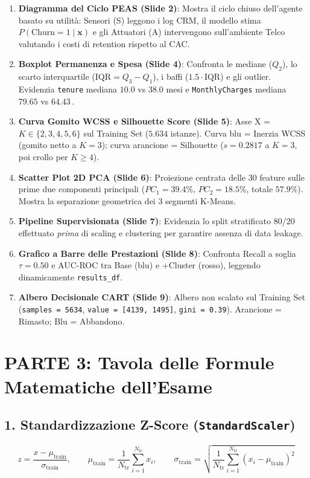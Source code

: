 \documentclass[11pt, a4paper]{article}
\begin{document}
\begin{enumerate}
    \item \textbf{Diagramma del Ciclo PEAS (Slide 2)}: Mostra il ciclo chiuso dell'agente basato su utilità: Sensori (S) leggono i log CRM, il modello stima $P(\text{Churn}=1 \mid \mathbf{x})$ e gli Attuatori (A) intervengono sull'ambiente Telco valutando i costi di retention rispetto al CAC.
    \item \textbf{Boxplot Permanenza e Spesa (Slide 4)}: Confronta le mediane ($Q_2$), lo scarto interquartile ($\text{IQR} = Q_3 - Q_1$), i baffi ($1.5 \cdot \text{IQR}$) e gli outlier. Evidenzia \texttt{tenure} mediana $10.0$ vs $38.0$ mesi e \texttt{MonthlyCharges} mediana $79.65$ vs $64.43$\,\texteuro.
    \item \textbf{Curva Gomito WCSS e Silhouette Score (Slide 5)}: Asse X = $K \in \{2,3,4,5,6\}$ sul Training Set ($5.634$ istanze). Curva blu = Inerzia WCSS (gomito netto a $K=3$); curva arancione = Silhouette ($s=0.2817$ a $K=3$, poi crollo per $K \ge 4$).
    \item \textbf{Scatter Plot 2D PCA (Slide 6)}: Proiezione centrata delle 30 feature sulle prime due componenti principali ($PC_1 = 39.4\%$, $PC_2 = 18.5\%$, totale $57.9\%$). Mostra la separazione geometrica dei 3 segmenti K-Means.
    \item \textbf{Pipeline Supervisionata (Slide 7)}: Evidenzia lo split stratificato 80/20 effettuato \textit{prima} di scaling e clustering per garantire assenza di data leakage.
    \item \textbf{Grafico a Barre delle Prestazioni (Slide 8)}: Confronta Recall a soglia $\tau=0.50$ e AUC-ROC tra Base (blu) e +Cluster (rosso), leggendo dinamicamente \texttt{results\_df}.
    \item \textbf{Albero Decisionale CART (Slide 9)}: Albero non scalato sul Training Set (\texttt{samples = 5634}, \texttt{value = [4139, 1495]}, \texttt{gini = 0.39}). Arancione = Rimasto; Blu = Abbandono.
\end{enumerate}

\newpage

\section*{PARTE 3: Tavola delle Formule Matematiche dell'Esame}

\subsection*{1. Standardizzazione Z-Score (\texttt{StandardScaler})}
\[
z = \frac{x - \mu_{\text{train}}}{\sigma_{\text{train}}}, \qquad \mu_{\text{train}} = \frac{1}{N_{\text{tr}}} \sum_{i=1}^{N_{\text{tr}}} x_i, \qquad \sigma_{\text{train}} = \sqrt{\frac{1}{N_{\text{tr}}} \sum_{i=1}^{N_{\text{tr}}} (x_i - \mu_{\text{train}})^2}
\]
\end{document}
